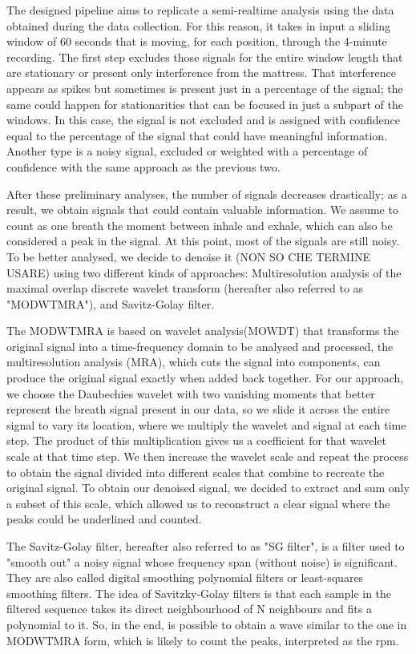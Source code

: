\documentclass[a4paper,11pt, oneside,italian]{article}
\begin{document}
The designed pipeline aims to replicate a semi-realtime analysis using the data obtained during the data collection. 
For this reason, it takes in input a sliding window of 60 seconds that is moving, for each position, through the 4-minute recording.
The first step excludes those signals for the entire window length that are stationary or present only interference from the mattress.
That interference appears as spikes but sometimes is present just in a percentage of the signal; the same could happen for stationarities that can be focused in just a subpart of the windows. In this case, the signal is not excluded and is assigned with confidence equal to the percentage of the signal that could have meaningful information.
 Another type is a noisy signal, excluded or weighted with a percentage of confidence with the same approach as the previous two.

 After these preliminary analyses, the number of signals decreases drastically; as a result, we obtain signals that could contain valuable information.
We assume to count as one breath the moment between inhale and exhale, which can also be considered a peak in the signal.
At this point, most of the signals are still noisy. To be better analysed, we decide to denoise it (NON SO CHE TERMINE USARE) using 
two different kinds of approaches: Multiresolution analysis of the maximal overlap discrete wavelet transform (hereafter also referred to as "MODWTMRA"), and Savitz-Golay filter.

The MODWTMRA is based on wavelet analysis(MOWDT) that transforms the original signal into a time-frequency domain 
to be analysed and processed, the multiresolution analysis (MRA), which cuts the signal into components, can produce the original signal exactly when added back together.
For our approach, we choose the Daubechies wavelet with two vanishing moments that better represent the breath signal present in our data, so we slide it across the entire signal to vary its location, where we multiply the wavelet and signal at each time step. 
The product of this multiplication gives us a coefficient for that wavelet scale at that time step. 
We then increase the wavelet scale and repeat the process to obtain the signal divided into different scales that combine to recreate the original signal. 
To obtain our denoised signal, we decided to extract and sum only a subset of this scale, which allowed us to reconstruct a clear signal where the peaks could be underlined and counted.

The Savitz-Golay filter, hereafter also referred to as "SG filter", is a filter used to "smooth out" a noisy signal whose frequency span (without noise) is significant. 
They are also called digital smoothing polynomial filters or least-squares smoothing filters. 
The idea of Savitzky-Golay filters is that each sample in the filtered sequence takes its direct neighbourhood of N neighbours and fits a polynomial to it.
So, in the end, is possible to obtain a wave similar to the one in MODWTMRA form, which is likely to count the peaks, interpreted as the rpm.
\end{document}
